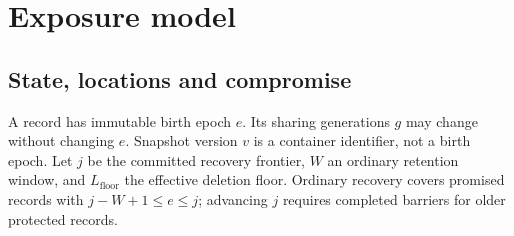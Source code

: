 \documentclass[pdflatex,sn-mathphys-num,twocolumn]{sn-jnl}
\theoremstyle{plain}
\theoremstyle{definition}
\begin{document}
\section{Exposure model}\label{sec:model}

\subsection{State, locations and compromise}
A record has immutable birth epoch $e$. Its sharing generations $g$ may change without changing $e$. Snapshot version $v$ is a container identifier, not a birth epoch. Let $j$ be the committed recovery frontier, $W$ an ordinary retention window, and $L_{\mathrm{floor}}$ the effective deletion floor. Ordinary recovery covers promised records with $j-W+1\le e\le j$; advancing $j$ requires completed barriers for older protected records.
\end{document}
